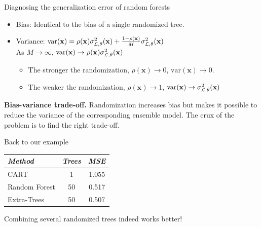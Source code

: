 \documentclass{beamer}
\begin{document}
\begin{frame}{Diagnosing the generalization error of random forests}

\begin{itemize}
\item Bias: {\color{blue} Identical} to the bias of a single randomized tree.
\item Variance: $\text{var}(\mathbf{x}) = \rho(\mathbf{x}) \sigma^2_{{\cal L},\theta}(\mathbf{x}) + \frac{1 - \rho(\mathbf{x})}{M} \sigma^2_{{\cal L},\theta}(\mathbf{x})$\\
As $M \to \infty$, {\color{red} $\text{var}(\mathbf{x}) \to \rho(\mathbf{x}) \sigma^2_{{\cal L},\theta}(\mathbf{x})$}
  \begin{itemize}
    \item The stronger the randomization, $\rho(\mathbf{x}) \to 0$, $\text{var}(\mathbf{x}) \to 0$.
    \item The weaker the randomization, $\rho(\mathbf{x}) \to 1$, $\text{var}(\mathbf{x}) \to \sigma^2_{{\cal L},\theta}(\mathbf{x})$
  \end{itemize}
\end{itemize}

\vspace{1cm}

{\bf Bias-variance trade-off.} Randomization increases bias but makes it
possible to reduce the variance of the corresponding ensemble model. The crux
of the problem is to {\color{red} find the right trade-off}.

\end{frame}

\begin{frame}{Back to our example}

\begin{table}
    \centering
    \begin{tabular}{| l c c |}
    \hline
        \textit{Method} & \textit{Trees} & \textit{MSE}  \\
    \hline
    \hline
    CART & 1 & {\color{red}1.055} \\
    Random Forest & 50 & {\color{blue}0.517} \\
    Extra-Trees & 50 & {\color{blue}0.507} \\
    \hline
    \end{tabular}
\end{table}

\vspace{0.5cm}

\begin{center}
Combining several randomized trees indeed works better!
\end{center}

\end{frame}
\end{document}
